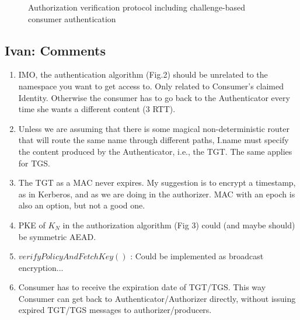 \begin{figure}
\begin{center}
\caption{Authorization verification protocol including challenge-based consumer authentication}
\label{fig:spectr-basic}
\end{center}
\end{figure}


\subsection{Ivan: Comments}
\begin{enumerate}
 \item IMO, the authentication algorithm (Fig.2) should be unrelated to the namespace you want to get access to. Only related to Consumer's claimed Identity. Otherwise the consumer has to go back to the Authenticator every time she wants a different content (3 RTT).
 \item Unless we are assuming that there is some magical non-deterministic router that will route the same name through different paths, I.name must specify the content produced by the Authenticator, i.e., the TGT. The same applies for TGS.
 \item The TGT as a MAC never expires. My suggestion is to encrypt a timestamp, as in Kerberos, and as we are doing in the authorizer. MAC with an epoch is also an option, but not a good one.
 \item PKE of $K_N$ in the authorization algorithm (Fig 3) could (and maybe should) be symmetric AEAD.
 \item $verifyPolicyAndFetchKey()$ : Could be implemented as broadcast encryption...
 \item Consumer has to receive the expiration date of TGT/TGS. This way Consumer can get back to Authenticator/Authorizer directly, without issuing expired TGT/TGS messages to authorizer/producers.
\end{enumerate}